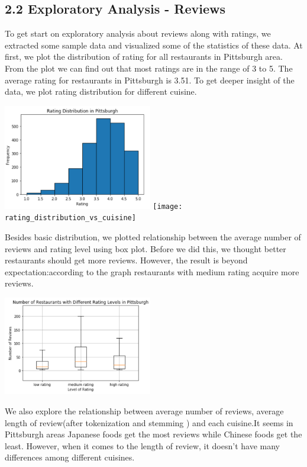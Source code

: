 \documentclass{neu_handout}
\begin{document}
\subsection*{2.2 Exploratory Analysis - Reviews}
To get start on exploratory analysis about reviews along with ratings, we extracted some sample data and visualized some of the statistics of these data. At first, we plot the distribution of rating for all restaurants in Pittsburgh area. From the plot we can find out that most ratings are in the range of 3 to 5. The average rating for restaurants in Pittsburgh is  3.51. To get deeper insight of the data, we plot rating distribution for different cuisine. 

\begin{center}
	\includegraphics[width=65mm,scale=0.3]{rating_distribution_in_Pittsburgh}
	\texttt{[image: rating\_distribution\_vs\_cuisine]}
\end{center}
Besides basic distribution, we plotted relationship between the average number of reviews and rating level using box plot. Before we did this, we thought better restaurants should get more reviews. However,  the result is beyond expectation:according to the graph restaurants with medium rating acquire more reviews. 
\begin{center}
	\includegraphics[width=65mm,scale=0.3]{number_of_restaurants_vs_rating_level.png}
\end{center}

We also explore the relationship between average number of reviews, average length of review(after tokenization and stemming ) and each cuisine.It seems in Pittsburgh areas Japanese foods get the most reviews while Chinese foods get the least. However, when it comes to the length of review, it doesn't have many differences among different cuisines. 
\end{document}
